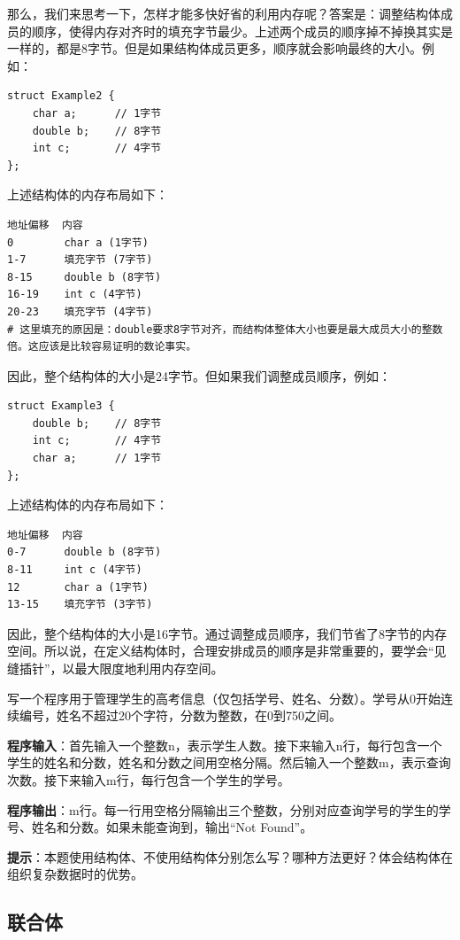 那么，我们来思考一下，怎样才能多快好省的利用内存呢？答案是：调整结构体成员的顺序，使得内存对齐时的填充字节最少。上述两个成员的顺序掉不掉换其实是一样的，都是8字节。但是如果结构体成员更多，顺序就会影响最终的大小。例如：
\begin{verbatim}
struct Example2 {
    char a;      // 1字节
    double b;    // 8字节
    int c;       // 4字节
};
\end{verbatim}
上述结构体的内存布局如下：
\begin{verbatim}
地址偏移  内容
0        char a (1字节)
1-7      填充字节 (7字节)
8-15     double b (8字节)
16-19    int c (4字节)
20-23    填充字节 (4字节) 
# 这里填充的原因是：double要求8字节对齐，而结构体整体大小也要是最大成员大小的整数倍。这应该是比较容易证明的数论事实。
\end{verbatim}
因此，整个结构体的大小是24字节。但如果我们调整成员顺序，例如：
\begin{verbatim}
struct Example3 {
    double b;    // 8字节
    int c;       // 4字节
    char a;      // 1字节
};
\end{verbatim}
上述结构体的内存布局如下：
\begin{verbatim}
地址偏移  内容
0-7      double b (8字节)
8-11     int c (4字节)
12       char a (1字节)
13-15    填充字节 (3字节)
\end{verbatim}
因此，整个结构体的大小是16字节。通过调整成员顺序，我们节省了8字节的内存空间。所以说，在定义结构体时，合理安排成员的顺序是非常重要的，要学会“见缝插针”，以最大限度地利用内存空间。

\begin{exercise}[学生信息管理]
写一个程序用于管理学生的高考信息（仅包括学号、姓名、分数）。学号从0开始连续编号，姓名不超过20个字符，分数为整数，在0到750之间。

\textbf{程序输入}：首先输入一个整数n，表示学生人数。接下来输入n行，每行包含一个学生的姓名和分数，姓名和分数之间用空格分隔。然后输入一个整数m，表示查询次数。接下来输入m行，每行包含一个学生的学号。

\textbf{程序输出}：m行。每一行用空格分隔输出三个整数，分别对应查询学号的学生的学号、姓名和分数。如果未能查询到，输出“Not Found”。

\textbf{提示}：本题使用结构体、不使用结构体分别怎么写？哪种方法更好？体会结构体在组织复杂数据时的优势。
\end{exercise}

\subsection{联合体}


